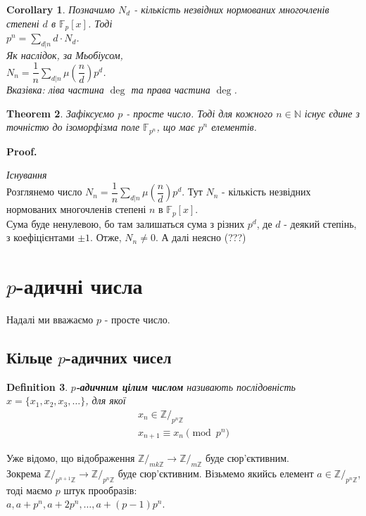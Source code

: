 \documentclass[a4paper, 14pt]{extarticle}
\makeatletter
\theoremstyle{theoremdd}
\newtheorem{theorem}{Theorem}[subsection]
\theoremstyle{theoremdd}
\newtheorem{definition}[theorem]{Definition}
\theoremstyle{theoremdd}
\theoremstyle{theoremdd}
\theoremstyle{theoremdd}
\theoremstyle{theoremdd}
\theoremstyle{theoremdd}
\theoremstyle{theoremdd}
\newtheorem{corollary}[theorem]{Corollary}
\def\qed{$\blacksquare$}
\renewenvironment{proof}[1][Proof.\\]{\par
\pushQED{\hfill \qed}%
\normalfont \topsep6\p@\@plus6\p@\relax
\trivlist
\item\relax
{\bfseries
#1\@addpunct{.}}\hspace\labelsep\ignorespaces
}{%
\popQED\endtrivlist\@endpefalse
}
\makeatother
\begin{document}
\begin{corollary}
Позначимо $N_d$ - кількість незвідних нормованих многочленів степені $d$ в $\mathbb{F}_p[x]$. Тоді\\
$p^n = \displaystyle\sum_{d | n} d \cdot N_d$.\\
Як наслідок, за Мьобіусом,\\
$N_n = \dfrac{1}{n} \displaystyle\sum_{d | n} \mu\left( \dfrac{n}{d} \right) p^d$.\\
\textit{Вказівка: ліва частина $\deg$ та права частина $\deg$.}
\end{corollary}

\begin{theorem}
Зафіксуємо $p$ - просте число. Тоді для кожного $n \in \mathbb{N}$ існує єдине з точністю до ізоморфізма поле $\mathbb{F}_{p^n}$, що має $p^n$ елементів.
\end{theorem}

\begin{proof}
\textit{Існування}\\
Розглянемо число $N_n = \dfrac{1}{n} \displaystyle\sum_{d | n} \mu\left( \dfrac{n}{d} \right) p^d$. Тут $N_n$ - кількість незвідних нормованих многочленів степені $n$ в $\mathbb{F}_p[x]$.\\
Сума буде ненулевою, бо там залишаться сума з різних $p^d$, де $d$ - деякий степінь, з коефіцієнтами $\pm 1$. Отже, $N_n \neq 0$. А далі неясно (???)
\end{proof}
\newpage

\section{$p$-адичні числа}
Надалі ми вважаємо $p$ - просте число.
\subsection{Кільце $p$-адичних чисел}
\begin{definition}
\textbf{$p$-адичним цілим числом} називають послідовність $x = \{x_1,x_2,x_3,\dots\}$, для якої
\begin{align*}
x_n \in \mathbb{Z}/_{p^n \mathbb{Z}} \\
x_{n+1} \equiv x_n \pmod {p^n}
\end{align*}
\end{definition}
Уже відомо, що відображення $\mathbb{Z}/_{mk \mathbb{Z}} \to \mathbb{Z}/_{m \mathbb{Z}}$ буде сюр'єктивним.\\
Зокрема $\mathbb{Z}/_{p^{n+1} \mathbb{Z}} \to \mathbb{Z}/_{p^n \mathbb{Z}}$ буде сюр'єктивним. Візьмемо якийсь елемент $a \in \mathbb{Z}/_{p^n \mathbb{Z}}$, тоді маємо $p$ штук прообразів:\\
$a, a+p^n, a+2p^n, \dots, a+(p-1)p^n$.
\end{document}
